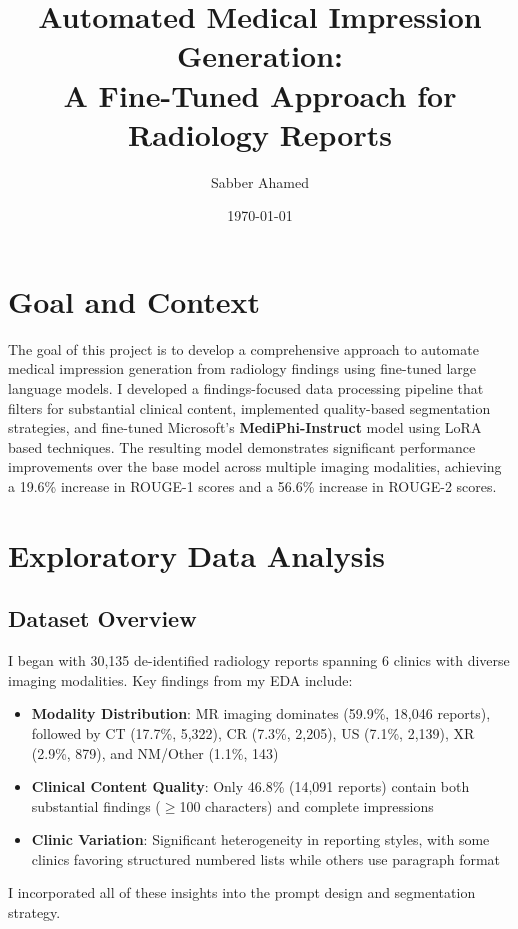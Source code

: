 \documentclass[11pt,letterpaper]{article}
\title{Automated Medical Impression Generation:\\
A Fine-Tuned Approach for Radiology Reports}
\author{Sabber Ahamed}
\date{\today}
\begin{document}
\maketitle

\section{Goal and Context}

The goal of this project is to develop a comprehensive approach to automate medical impression generation from radiology findings using fine-tuned large language models. I developed a findings-focused data processing pipeline that filters for substantial clinical content, implemented quality-based segmentation strategies, and fine-tuned Microsoft's \textbf{MediPhi-Instruct} model using LoRA based techniques. The resulting model demonstrates significant performance improvements over the base model across multiple imaging modalities, achieving a 19.6\% increase in ROUGE-1 scores and a 56.6\% increase in ROUGE-2 scores.

\section{Exploratory Data Analysis}

\subsection{Dataset Overview}
I began with 30,135 de-identified radiology reports spanning 6 clinics with diverse imaging modalities. Key findings from my EDA include:

\begin{itemize}
    \item \textbf{Modality Distribution}: MR imaging dominates (59.9\%, 18,046 reports), followed by CT (17.7\%, 5,322), CR (7.3\%, 2,205), US (7.1\%, 2,139), XR (2.9\%, 879), and NM/Other (1.1\%, 143)
    \item \textbf{Clinical Content Quality}: Only 46.8\% (14,091 reports) contain both substantial findings ($\geq$100 characters) and complete impressions
    \item \textbf{Clinic Variation}: Significant heterogeneity in reporting styles, with some clinics favoring structured numbered lists while others use paragraph format
\end{itemize}

I incorporated all of these insights into the prompt design and segmentation strategy.
\end{document}
